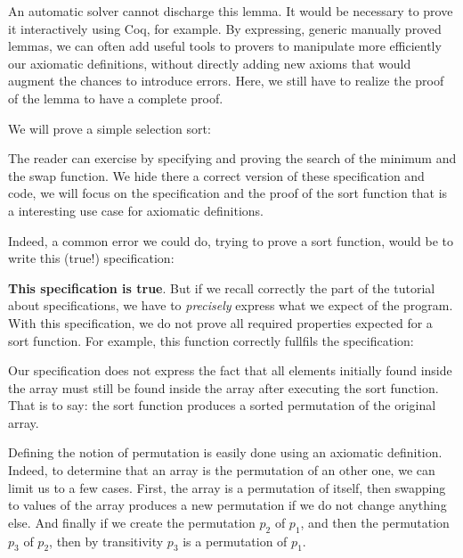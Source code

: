 An automatic solver cannot discharge this lemma. It would be necessary
to prove it interactively using Coq, for example. By expressing, generic
manually proved lemmas, we can often add useful tools to provers to
manipulate more efficiently our axiomatic definitions, without directly
adding new axioms that would augment the chances to introduce errors.
Here, we still have to realize the proof of the lemma to have a complete
proof.





We will prove a simple selection sort:






The reader can exercise by specifying and proving the search of the
minimum and the swap function. We hide there a correct version of these
specification and code, we will focus on the specification and the proof
of the sort function that is a interesting use case for axiomatic
definitions.



\begin{Spoiler}
\end{Spoiler}


Indeed, a common error we could do, trying to prove a sort function,
would be to write this (true!) specification:







\textbf{This specification is true}. But if we recall correctly the part
of the tutorial about specifications, we have to \emph{precisely}
express what we expect of the program. With this specification, we do
not prove all required properties expected for a sort function. For
example, this function correctly fullfils the specification:






Our specification does not express the fact that all elements initially
found inside the array must still be found inside the array after
executing the sort function. That is to say: the sort function produces
a sorted permutation of the original array.

Defining the notion of permutation is easily done using an axiomatic
definition. Indeed, to determine that an array is the permutation of an
other one, we can limit us to a few cases. First, the array is a
permutation of itself, then swapping to values of the array produces a
new permutation if we do not change anything else. And finally if we
create the permutation $p_2$ of $p_1$, and then the permutation
$p_3$ of $p_2$, then by transitivity $p_3$ is a permutation of
$p_1$.



